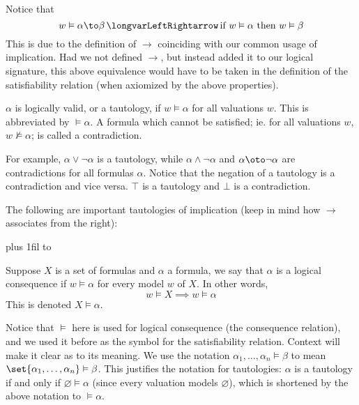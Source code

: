 Notice that
$$ w\vDash\alpha\to\beta \iff \hbox{if }w\vDash\alpha\hbox{ then }w\vDash\beta $$
This is due to the definition of $\to$ coinciding with our common usage of implication.
Had we not defined $\to$, but instead added it to our logical signature, this above equivalence would have to be taken in the definition of the satisfiability relation (when axiomized by the above
properties).

\bdefn

    $\alpha$ is {\emphcolor logically valid}, or a {\emphcolor tautology}, if $w\vDash\alpha$ for all valuations $w$.
    This is abbreviated by $\vDash\alpha$.
    A formula which cannot be satisfied; ie. for all valuations $w$, $w\nvDash\alpha$; is called a {\emphcolor contradiction}.

\edefn

For example, $\alpha\lor\neg\alpha$ is a tautology, while $\alpha\land\neg\alpha$ and $\alpha\oto\neg\alpha$ are contradictions for all formulas $\alpha$.
Notice that the negation of a tautology is a contradiction and vice versa.
$\top$ is a tautology and $\bot$ is a contradiction.

The following are important tautologies of implication (keep in mind how $\to$ associates from the right):

\medskip
\tabskip=0pt plus 1fil
\halign to 
\medskip

\bdefn

    Suppose $X$ is a set of formulas and $\alpha$ a formula, we say that $\alpha$ is a {\emphcolor logical consequence}%
     if $w\vDash\alpha$ for every model $w$ of $X$.
    In other words,
    $$ w\vDash X\implies w\vDash\alpha $$
    This is denoted $X\vDash\alpha$.

\edefn

Notice that $\vDash$ here is used for logical consequence (the consequence relation), and we used it before as the symbol for the satisfiability relation.
Context will make it clear as to its meaning.
We use the notation $\alpha_1,\dots,\alpha_n\vDash\beta$ to mean $\set{\alpha_1,\dots,\alpha_n}\vDash\beta$.
This justifies the notation for tautologies: $\alpha$ is a tautology if and only if $\varnothing\vDash\alpha$ (since every valuation models $\varnothing$), which is shortened by the above notation to
$\vDash\alpha$.

